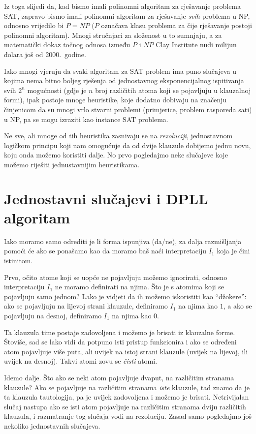 Iz toga slijedi da, kad bismo imali polinomni algoritam za rješavanje problema SAT, zapravo bismo imali polinomni algoritam za rješavanje \emph{svih} problema u NP, odnosno vrijedilo bi $P=NP$ ($P$ označava klasu problema za čije rješavanje postoji polinomni algoritam).
Mnogi stručnjaci za složenost u to sumnjaju, a za matematički dokaz točnog odnosa između $P$ i $NP$ Clay Institute nudi milijun dolara još od 2000.\ godine.

Iako mnogi vjeruju da svaki algoritam za SAT problem ima puno slu\-ča\-je\-va u kojima nema bitno boljeg rješenja od jednostavnog eksponencijalnog ispitivanja svih $2^n$ mogućnosti (gdje je $n$ broj različitih atoma koji se pojavljuju u klauzalnoj formi), ipak postoje mnoge heuristike, koje dodatno dobivaju na značenju činjenicom da su mnogi vrlo stvarni problemi (primjerice, problem rasporeda sati) u NP, pa se mogu izraziti kao instance SAT problema.

Ne sve, ali mnoge od tih heuristika zasnivaju se na \emph{rezoluciji}, jednostavnom logičkom principu koji nam omogućuje da od dvije klauzule dobijemo jednu novu, koju onda možemo koristiti dalje. No prvo pogledajmo neke slučajeve koje možemo riješiti jednustavnijim heuristikama.

\section{Jednostavni slučajevi i DPLL algoritam}

Iako moramo samo odrediti je li forma ispunjiva (da/ne), za dalja raz\-miš\-lja\-nja pomoći će ako se ponašamo kao da moramo baš naći interpretaciju $I_1$ koja je čini istinitom.

Prvo, očito atome koji se uopće ne pojavljuju možemo ignorirati, odnosno interpretaciju $I_1$ ne moramo definirati na njima. Što je s atomima koji se pojavljuju samo jednom? Lako je vidjeti da ih možemo iskoristiti kao ``džokere'': ako se pojavljuju na lijevoj strani klauzule, definiramo $I_1$ na njima kao $1$, a ako se pojavljuju na desnoj, definiramo $I_1$ na njima kao $0$.

Ta klauzula time postaje zadovoljena i možemo je brisati iz klauzalne forme. Štoviše, sad se lako vidi da potpuno isti pristup funkcionira i ako se određeni atom pojavljuje više puta, ali uvijek na istoj strani klauzule (uvijek na lijevoj, ili uvijek na desnoj). Takvi atomi zovu se \emph{čisti} atomi.

Idemo dalje. Što ako se neki atom pojavljuje dvaput, na različitim stranama klauzule? Ako se pojavljuje na različitim stranama \emph{iste} klauzule, tad znamo da je ta klauzula tautologija, pa je uvijek zadovoljena i možemo je brisati. Netrivijalan slučaj nastupa ako se isti atom pojavljuje na različitim stranama dviju različitih klauzula, i razmatranje tog slučaja vodi na rezoluciju. Zasad samo pogledajmo još nekoliko jednostavnih slučajeva.


